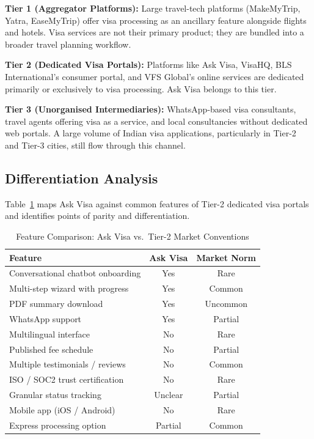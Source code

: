 \documentclass[journal, 10pt, twoside]{IEEEtran}
\begin{document}
\textbf{Tier 1 (Aggregator Platforms):} Large travel-tech platforms
(MakeMyTrip, Yatra, EaseMyTrip) offer visa processing as an ancillary
feature alongside flights and hotels. Visa services are not their primary
product; they are bundled into a broader travel planning workflow.

\textbf{Tier 2 (Dedicated Visa Portals):} Platforms like Ask Visa,
VisaHQ, BLS International's consumer portal, and VFS Global's online
services are dedicated primarily or exclusively to visa processing. Ask
Visa belongs to this tier.

\textbf{Tier 3 (Unorganised Intermediaries):} WhatsApp-based visa
consultants, travel agents offering visa as a service, and local
consultancies without dedicated web portals. A large volume of Indian
visa applications, particularly in Tier-2 and Tier-3 cities, still
flow through this channel.

\subsection{Differentiation Analysis}
Table~\ref{tab:competitive} maps Ask Visa against common features of
Tier-2 dedicated visa portals and identifies points of parity and
differentiation.

\begin{table}[ht]
  \centering
  \caption{Feature Comparison: Ask Visa vs.\ Tier-2 Market Conventions}
  \label{tab:competitive}
  \begin{tabular}{@{}p{3.4cm} c c@{}}
    \toprule
    \textbf{Feature} & \textbf{Ask Visa} & \textbf{Market Norm} \\
    \midrule
    Conversational chatbot onboarding & Yes   & Rare \\
    Multi-step wizard with progress   & Yes   & Common \\
    PDF summary download              & Yes   & Uncommon \\
    WhatsApp support                  & Yes   & Partial \\
    Multilingual interface            & No    & Rare \\
    Published fee schedule            & No    & Partial \\
    Multiple testimonials / reviews   & No    & Common \\
    ISO / SOC2 trust certification    & No    & Rare \\
    Granular status tracking          & Unclear & Partial \\
    Mobile app (iOS / Android)        & No    & Rare \\
    Express processing option         & Partial & Common \\
    \bottomrule
  \end{tabular}
\end{table}
\end{document}
